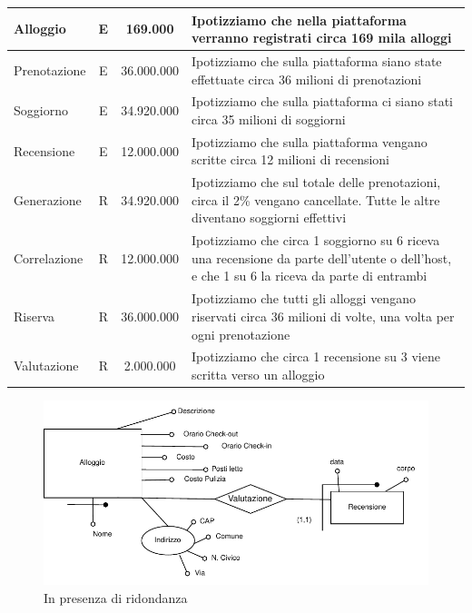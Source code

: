\begin{longtable}{|l|c|c|p{6.3cm}|}
      \endlastfoot
      Alloggio                 & E             & 169.000         & {Ipotizziamo che nella piattaforma verranno registrati circa 169 mila alloggi}                                                               \\\hline
      Prenotazione             & E             & 36.000.000      & {Ipotizziamo che sulla piattaforma siano state effettuate circa 36 milioni di prenotazioni}                                                  \\\hline
      Soggiorno                & E             & 34.920.000      & {Ipotizziamo che sulla piattaforma ci siano stati circa 35 milioni di soggiorni}                                                             \\\hline
      Recensione               & E             & 12.000.000      & {Ipotizziamo che sulla piattaforma vengano scritte circa 12 milioni di recensioni}                                                           \\\hline
      Generazione              & R             & 34.920.000      & {Ipotizziamo che sul totale delle prenotazioni, circa il 2\% vengano cancellate. Tutte le altre diventano soggiorni effettivi}               \\\hline
      Correlazione             & R             & 12.000.000      & {Ipotizziamo che circa 1 soggiorno su 6 riceva una recensione da parte dell'utente o dell'host, e che 1 su 6 la riceva da parte di entrambi} \\\hline
      Riserva                  & R             & 36.000.000      & {Ipotizziamo che tutti gli alloggi vengano riservati circa 36 milioni di volte, una volta per ogni prenotazione}                             \\\hline
      Valutazione              & R             & 2.000.000       & {Ipotizziamo che circa 1 recensione su 3 viene scritta verso un alloggio}                                                                    \\\hline
\end{longtable}
\normalsize

\clearpage
\begin{figure}[H]
      \includegraphics[width=\textwidth]{resources/pdf/page5.pdf}
      \caption{In presenza di ridondanza}
\end{figure}

